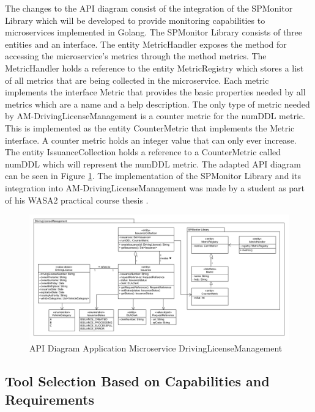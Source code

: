 The changes to the API diagram consist of the integration of the SPMonitor
Library which will be developed to provide monitoring capabilities to
microservices implemented in Golang. The SPMonitor Library consists of three
entities and an interface. The entity MetricHandler exposes the method for
accessing the microservice's metrics through the method metrics. The
MetricHandler holds a reference to the entity MetricRegistry which stores a
list of all metrics that are being collected in the microservice. Each metric
implements the interface Metric that provides the basic properties needed by
all metrics which are a name and a help description. The only type of metric
needed by AM-DrivingLicenseManagement is a counter metric for the numDDL metric.
This is implemented as the entity CounterMetric that implements the Metric
interface. A counter metric holds an integer value that can only ever increase.
The entity IssuanceCollection holds a reference to a CounterMetric called
numDDL which will represent the numDDL metric. The adapted API diagram can be
seen in Figure \ref{fig:api_diagram_drivinglicensemanagement}. The
implementation of the SPMonitor Library and its integration into
AM-DrivingLicenseManagement was made by a student as part of his WASA2 practical
course thesis \cite{Am23}.

\begin{figure}[tb]
  \centering
  \includegraphics[width=\textwidth]{figures/api_diagram_drivinglicensemanagement.png}
  \caption{API Diagram Application Microservice DrivingLicenseManagement}
  \label{fig:api_diagram_drivinglicensemanagement}
\end{figure}

\subsection{Tool Selection Based on Capabilities and Requirements}

